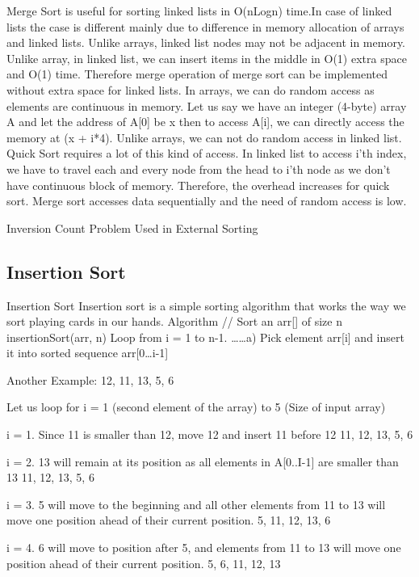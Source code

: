 \documentclass{article}
\begin{document}
Merge Sort is useful for sorting linked lists in O(nLogn) time.In case of linked lists the case is different mainly due to difference in memory allocation of arrays and linked lists. Unlike arrays, linked list nodes may not be adjacent in memory. Unlike array, in linked list, we can insert items in the middle in O(1) extra space and O(1) time. Therefore merge operation of merge sort can be implemented without extra space for linked lists.
In arrays, we can do random access as elements are continuous in memory. Let us say we have an integer (4-byte) array A and let the address of A[0] be x then to access A[i], we can directly access the memory at (x + i*4). Unlike arrays, we can not do random access in linked list. Quick Sort requires a lot of this kind of access. In linked list to access i’th index, we have to travel each and every node from the head to i’th node as we don’t have continuous block of memory. Therefore, the overhead increases for quick sort. Merge sort accesses data sequentially and the need of random access is low.

Inversion Count Problem
Used in External Sorting











\subsection{Insertion Sort}

Insertion Sort
Insertion sort is a simple sorting algorithm that works the way we sort playing cards in our hands.
Algorithm
// Sort an arr[] of size n
insertionSort(arr, n)
Loop from i = 1 to n-1.
……a) Pick element arr[i] and insert it into sorted sequence arr[0…i-1]


Another Example: 
12, 11, 13, 5, 6

Let us loop for i = 1 (second element of the array) to 5 (Size of input array)

i = 1. Since 11 is smaller than 12, move 12 and insert 11 before 12
11, 12, 13, 5, 6

i = 2. 13 will remain at its position as all elements in A[0..I-1] are smaller than 13
11, 12, 13, 5, 6

i = 3. 5 will move to the beginning and all other elements from 11 to 13 will move one position ahead of their current position.
5, 11, 12, 13, 6

i = 4. 6 will move to position after 5, and elements from 11 to 13 will move one position ahead of their current position.
5, 6, 11, 12, 13
\end{document}
